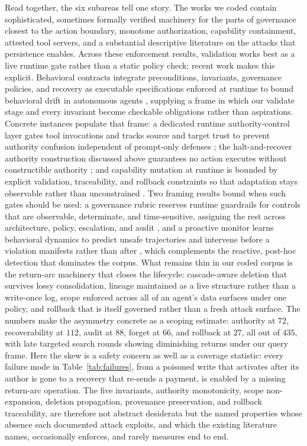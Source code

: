 Read together, the six subareas tell one story. The works we coded contain sophisticated, sometimes formally verified machinery for the parts of governance closest to the action boundary, monotone authorization, capability containment, attested tool servers, and a substantial descriptive literature on the attacks that persistence enables. Across these enforcement results, validation works best as a live runtime gate rather than a static policy check; recent work makes this explicit. Behavioral contracts integrate preconditions, invariants, governance policies, and recovery as executable specifications enforced at runtime to bound behavioral drift in autonomous agents \citep{bhardwaj2026contracts}, supplying a frame in which our validate stage and every invariant become checkable obligations rather than aspirations. Concrete instances populate that frame: a dedicated runtime authority-control layer gates tool invocations and tracks source and target trust to prevent authority confusion independent of prompt-only defenses \citep{qin2026airguard}; the halt-and-recover authority construction discussed above guarantees no action executes without constructible authority \citep{fernandez2026authority}; and capability mutation at runtime is bounded by explicit validation, traceability, and rollback constraints so that adaptation stays observable rather than unconstrained \citep{garralda2026governed}. Two framing results bound when such gates should be used: a governance rubric reserves runtime guardrails for controls that are observable, determinate, and time-sensitive, assigning the rest across architecture, policy, escalation, and audit \citep{koch2026governance}, and a proactive monitor learns behavioral dynamics to predict unsafe trajectories and intervene before a violation manifests rather than after \citep{wang2025probguard}, which complements the reactive, post-hoc detection that dominates the corpus. What remains thin in our coded corpus is the return-arc machinery that closes the lifecycle: cascade-aware deletion that survives lossy consolidation, lineage maintained as a live structure rather than a write-once log, scope enforced across all of an agent's data surfaces under one policy, and rollback that is itself governed rather than a fresh attack surface. The numbers make the asymmetry concrete as a scoping estimate: authority at $72$, recoverability at $112$, audit at $88$, forget at $66$, and rollback at $27$, all out of $435$, with late targeted search rounds showing diminishing returns under our query frame. Here the skew is a safety concern as well as a coverage statistic: every failure mode in Table~\ref{tab:failures}, from a poisoned write that activates after its author is gone to a recovery that re-sends a payment, is enabled by a missing return-arc operation. The five invariants, authority monotonicity, scope non-expansion, deletion propagation, provenance preservation, and rollback traceability, are therefore not abstract desiderata but the named properties whose absence each documented attack exploits, and which the existing literature names, occasionally enforces, and rarely measures end to end.
